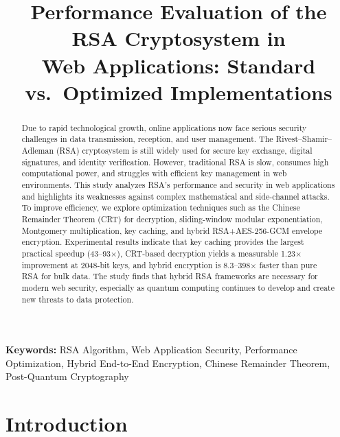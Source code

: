 \documentclass[conference]{IEEEtran}
\newcommand{\keywords}[1]{\par\addvspace\medskipamount\noindent\textbf{Keywords:} #1}
\begin{document}
\title{Performance Evaluation of the RSA Cryptosystem in\\Web Applications: Standard vs.\ Optimized Implementations}

\author{
}

\maketitle

\begin{abstract}
Due to rapid technological growth, online applications now face serious security challenges in data transmission, reception, and user management. The Rivest--Shamir--Adleman (RSA) cryptosystem is still widely used for secure key exchange, digital signatures, and identity verification. However, traditional RSA is slow, consumes high computational power, and struggles with efficient key management in web environments. This study analyzes RSA's performance and security in web applications and highlights its weaknesses against complex mathematical and side-channel attacks. To improve efficiency, we explore optimization techniques such as the Chinese Remainder Theorem (CRT) for decryption, sliding-window modular exponentiation, Montgomery multiplication, key caching, and hybrid RSA+AES-256-GCM envelope encryption. Experimental results indicate that key caching provides the largest practical speedup (43--93$\times$), CRT-based decryption yields a measurable 1.23$\times$ improvement at 2048-bit keys, and hybrid encryption is 8.3--398$\times$ faster than pure RSA for bulk data. The study finds that hybrid RSA frameworks are necessary for modern web security, especially as quantum computing continues to develop and create new threats to data protection.
\end{abstract}

\keywords{RSA Algorithm, Web Application Security, Performance Optimization, Hybrid End-to-End Encryption, Chinese Remainder Theorem, Post-Quantum Cryptography}

\section{Introduction}
\label{sec:intro}
\end{document}
